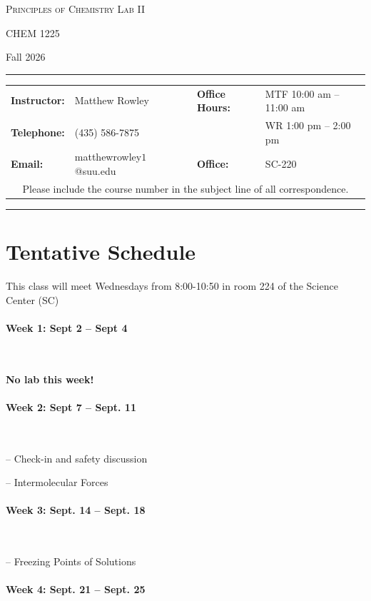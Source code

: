 \documentclass[12pt, letterpaper]{article}
\begin{document}
\begin{center}
	{\Large \textsc{Principles of Chemistry Lab II}}

	CHEM 1225
\end{center}

\begin{center}
	{\large Fall 2026}
\end{center}
\begin{center}
	\rule{0.99\textwidth}{0.4pt}
	\begin{tabular}{llcll}
		\textbf{Instructor:} & Matthew Rowley           &  & \textbf{Office Hours:} & MTF 10:00 am -- 11:00 am \\
		\textbf{Telephone:}  & (435) 586-7875           &  &                        & WR 1:00 pm -- 2:00 pm    \\
		\textbf{Email:}      & matthewrowley$1$@suu.edu &  & \textbf{Office:}       & SC-220                   \\
		\multicolumn{5}{c}{Please include the course number in the subject line of all correspondence.}
	\end{tabular}
	\rule{0.99\textwidth}{0.4pt}
\end{center}

\section*{Tentative Schedule}
This class will meet Wednesdays from 8:00-10:50 in room 224 of the Science Center (SC)

\paragraph{Week 1: Sept 2 -- Sept 4}~

\textbf{No lab this week!}

\paragraph{Week 2: Sept 7 -- Sept. 11}~

-- Check-in and safety discussion

-- Intermolecular Forces

\paragraph{Week 3: Sept. 14 -- Sept. 18}~

-- Freezing Points of Solutions

\paragraph{Week 4: Sept. 21 -- Sept. 25}~
\end{document}
